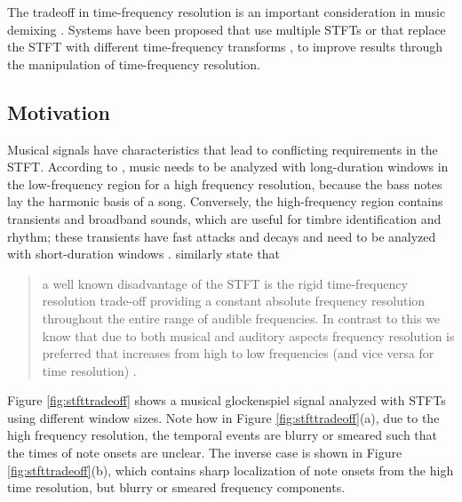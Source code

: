 \documentclass[report.tex]{subfiles}
\begin{document}
The tradeoff in time-frequency resolution is an important consideration in music demixing \parencite{tftradeoff1, tftradeoff2}. Systems have been proposed that use multiple STFTs \parencite{fitzgerald2, driedger} or that replace the STFT with different time-frequency transforms \parencite{fitzgerald2, cqtseparation, bettermusicsep}, to improve results through the manipulation of time-frequency resolution.

\subsection{Motivation}
\label{sec:motivation}

Musical signals have characteristics that lead to conflicting requirements in the STFT. According to \textcite{doerflerphd}, music needs to be analyzed with long-duration windows in the low-frequency region for a high frequency resolution, because the bass notes lay the harmonic basis of a song. Conversely, the high-frequency region contains transients and broadband sounds, which are useful for timbre identification and rhythm; these transients have fast attacks and decays and need to be analyzed with short-duration windows \parencite{doerflerphd}. \citeauthor{cqtransient} similarly state that

\begin{quote}
	a well known disadvantage of the STFT is the rigid time-frequency resolution trade-off providing a constant absolute frequency resolution throughout the entire range of audible frequencies. In contrast to this we know that due to both musical and auditory aspects frequency resolution is preferred that increases from high to low frequencies (and vice versa for time resolution) \parencite[1]{cqtransient}.
\end{quote}

Figure \ref{fig:stfttradeoff} shows a musical glockenspiel signal analyzed with STFTs using different window sizes. Note how in Figure \ref{fig:stfttradeoff}(a), due to the high frequency resolution, the temporal events are blurry or smeared such that the times of note onsets are unclear. The inverse case is shown in Figure \ref{fig:stfttradeoff}(b), which contains sharp localization of note onsets from the high time resolution, but blurry or smeared frequency components.
\end{document}
